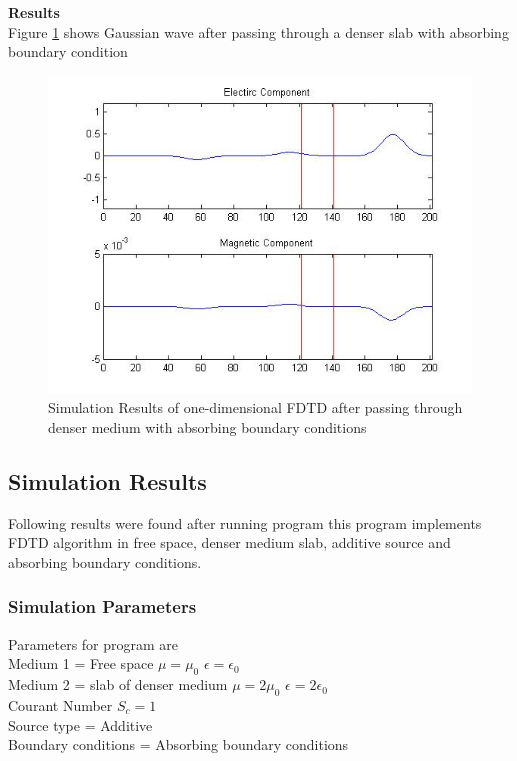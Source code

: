\textbf{Results}\\
Figure \ref{fig:abc} shows Gaussian wave after passing through a denser slab with absorbing boundary condition
\begin{figure}[htbp]
	\centering
		\includegraphics[width=5in]{Figures/abc.jpg}
	\caption[Simulation Result of 1 dimensional FDTD after passing through denser medium]{Simulation Results of one-dimensional FDTD after passing through denser medium with absorbing boundary conditions}
	\label{fig:abc}
\end{figure}

\subsection{Simulation Results}
Following results were found after running program %
 this program implements FDTD algorithm in free space, denser medium slab, additive source and absorbing boundary conditions.
\subsubsection{Simulation Parameters}
Parameters for program %
are \\
Medium 1 = Free space  $\mu=\mu_0$  $\epsilon=\epsilon_0$\\
Medium 2 = slab of denser medium $\mu=2\mu_0$  $\epsilon=2\epsilon_0$\\
Courant Number $S_c=1$\\
Source type = Additive\\
Boundary conditions = Absorbing boundary conditions
